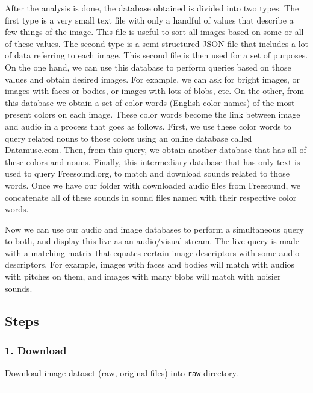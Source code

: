 After the analysis is done, the database obtained is divided into two types. The first type is a very small text file with only a handful of values that describe a few things of the image. This file is useful to sort all images based on some or all of these values. The second type is a semi-structured JSON file that includes a lot of data referring to each image. This second file is then used for a set of purposes. On the one hand, we can use this database to perform queries based on those values and obtain desired images. For example, we can ask for bright images, or images with faces or bodies, or images with lots of blobs, etc. On the other, from this database we obtain a set of color words (English color names) of the most present colors on each image. These color words become the link between image and audio in a process that goes as follows. First, we use these color words to query related nouns to those colors using an online database called Datamuse.com. Then, from this query, we obtain another database that has all of these colors and nouns. Finally, this intermediary database that has only text is used to query Freesound.org, to match and download sounds related to those words. Once we have our folder with downloaded audio files from Freesound, we concatenate all of these sounds in sound files named with their respective color words.

Now we can use our audio and image databases to perform a simultaneous query to both, and display this live as an audio/visual stream. The live query is made with a matching matrix that equates certain image descriptors with some audio descriptors. For example, images with faces and bodies will match with audios with pitches on them, and images with many blobs will match with noisier sounds.

\hypertarget{steps}{%
\subsection{Steps}\label{steps}}

\hypertarget{download}{%
\subsubsection{1. Download}\label{download}}

Download image dataset (raw, original files) into \texttt{raw} directory.

\begin{center}\rule{0.5\linewidth}{\linethickness}\end{center}

